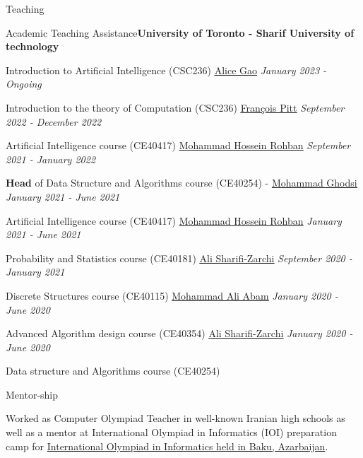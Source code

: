 \documentclass{resume} %
\begin{document}
\begin{rSection}{Teaching}

\begin{rSubsection}{Academic Teaching Assistance}{\textcolor{Black!70}{\bf University of Toronto - Sharif University of technology}}{}{}
\begin{small}
\item Introduction to Artificial Intelligence (CSC236) \href{https://www.cs.toronto.edu/~axgao/}{\underline{Alice Gao}} \hfill \textcolor{Black!70}{\it January 2023 - Ongoing}
\item Introduction to the theory of Computation (CSC236) \href{https://www.cs.toronto.edu/~fpitt/}{\underline{François Pitt}} \hfill \textcolor{Black!70}{\it September 2022 - December 2022}
\item Artificial Intelligence course (CE40417) \href{http://blogs.bu.edu/mhrohban/}{\underline{Mohammad Hossein Rohban}} \hfill \textcolor{Black!70}{\it September 2021 - January 2022}
\item {\bf Head}  of Data Structure and Algorithms course (CE40254) - \href{http://sharif.edu/~ghodsi/}{\underline{Mohammad Ghodsi}} \hfill \textcolor{Black!70}{\it January 2021 - June 2021}
\item Artificial Intelligence course (CE40417) \href{http://blogs.bu.edu/mhrohban/}{\underline{Mohammad Hossein Rohban}} \hfill \textcolor{Black!70}{\it January 2021 - June 2021}
\item Probability and Statistics course (CE40181) \href{https://scholar.google.com/citations?user=GbJMZLIAAAAJ&hl=en}{\underline{Ali Sharifi-Zarchi}} \hfill \textcolor{Black!70}{\it September 2020 - January 2021}
\item Discrete Structures course (CE40115) \href{https://scholar.google.com/citations?user=xuNJ-d8AAAAJ&hl=en}{\underline{Mohammad Ali Abam}} \hfill \textcolor{Black!70}{\it January 2020 - June 2020}
\item Advanced Algorithm design course (CE40354) \href{https://scholar.google.com/citations?user=GbJMZLIAAAAJ&hl=en}{\underline{Ali Sharifi-Zarchi}} \hfill \textcolor{Black!70}{\it January 2020 - June 2020} 
\item Data structure and Algorithms course (CE40254)
\end{small}
\end{rSubsection}
\begin{rSubsection}{Mentor-ship}{}{}{}
\itemsep -1pt
\begin{small}
\item \parbox{15cm}{Worked as Computer Olympiad Teacher in well-known Iranian high schools as well as a mentor at International Olympiad in Informatics (IOI) preparation camp for \href{https://ioi2019.az/}{International Olympiad in Informatics held in Baku, Azarbaijan}.}

\end{small}
\end{rSubsection}
\end{rSection}
\end{document}
